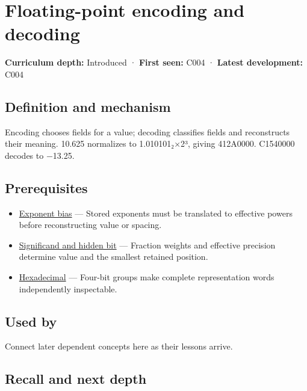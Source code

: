 \hypertarget{appendix-6854d0e2218e}{}\label{referencestart:appendix-6854d0e2218e}
\section{Floating-point encoding and decoding}\label{appendix-6854d0e2218e-floating-point-encoding-and-decoding}

\textbf{Curriculum depth:} Introduced · \textbf{First seen:} C004 · \textbf{Latest development:} C004

\subsection{Definition and mechanism}\label{appendix-6854d0e2218e-definition-and-mechanism}

Encoding chooses fields for a value; decoding classifies fields and reconstructs their meaning. 10.625 normalizes to 1.010101₂×2³, giving 412A0000. C1540000 decodes to −13.25.

\subsection{Prerequisites}\label{appendix-6854d0e2218e-prerequisites}

\begin{itemize}
\tightlist
\item
  \hyperref[appendix-2fae058c82e1]{Exponent bias} --- Stored exponents must be translated to effective powers before reconstructing value or spacing.
\item
  \hyperref[appendix-a24fd710cf67]{Significand and hidden bit} --- Fraction weights and effective precision determine value and the smallest retained position.
\item
  \hyperref[appendix-6b8075763724]{Hexadecimal} --- Four-bit groups make complete representation words independently inspectable.
\end{itemize}

\subsection{Used by}\label{appendix-6854d0e2218e-used-by}

Connect later dependent concepts here as their lessons arrive.

\subsection{Recall and next depth}\label{appendix-6854d0e2218e-recall-and-next-depth}

